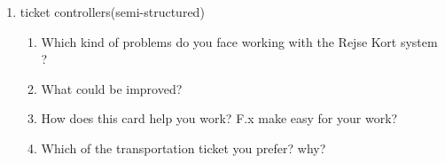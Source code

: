 \begin{enumerate}
		\item ticket controllers(semi-structured)
		\begin{enumerate}
			\item Which kind of problems do you face working with the Rejse Kort system ?
			\item What could be improved?
			\item How does this card help you work? F.x make easy for your work?
			\item Which of the transportation ticket you prefer? why?
		\end{enumerate}

\end{enumerate}